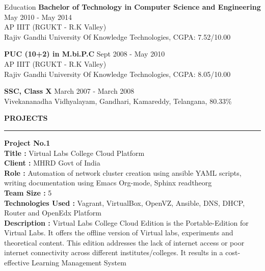 \documentclass{resume} %
\begin{document}

\begin{rSection}{Education}
  {\bf Bachelor of Technology in Computer Science and Engineering} \hfill {May 2010 - May 2014}
  \\ 
  AP IIIT (RGUKT - R.K Valley)
  \\
  Rajiv Gandhi University Of Knowledge Technologies,  CGPA: 7.52/10.00  
  
  {\bf PUC (10+2) in M.bi.P.C} \hfill {Sept 2008 - May 2010}
  \\
  AP IIIT (RGUKT - R.K Valley)
  \\
  Rajiv Gandhi University Of Knowledge Technologies,  CGPA: 8.05/10.00  
  
  {\textbf{SSC, Class X}}  \hfill March 2007 - March  2008 \\
  Vivekananadha Vidhyalayam, Gandhari, Kamareddy, Telangana, 80.33\% 

\end{rSection}

\break


\textbf{PROJECTS}
\sectionlineskip \\ \hrule \textbf {Project No.1} \\ \textbf{Title : }
Virtual Labs College Cloud Platform \\ \textbf{Client : } MHRD Govt of
India \\ \textbf{Role : } Automation of network cluster creation using
ansible YAML scripts, writing documentation using Emacs Org-mode,
Sphinx readtheorg\\ \textbf{Team Size : } 5 \\ \textbf{Technologies
  Used :} Vagrant, VirtualBox, OpenVZ, Ansible, DNS, DHCP, Router and
OpenEdx Platform \\ \textbf{Description :} Virtual Labs College Cloud
Edition is the Portable-Edition for Virtual Labs. It offers the
offline version of Virtual labs, experiments and theoretical
content. This edition addresses the lack of internet access or poor
internet connectivity across different institutes/colleges. It results
in a cost-effective Learning Management System
\end{document}
